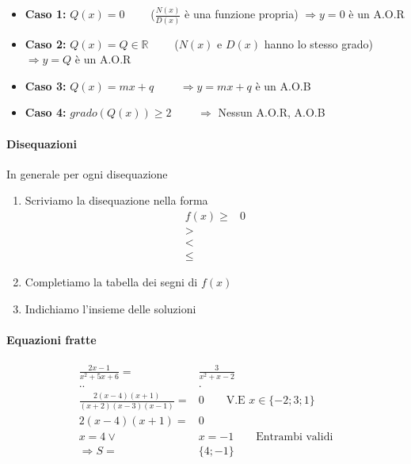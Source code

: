 \documentclass[../main.tex]{subfiles}
\begin{document}
\vspace{0.5cm}
\begin{itemize}
    \item \textbf{Caso 1:} $Q(x) = 0 \phantom{--}$ ($\frac{N(x)}{D(x)}$ è una funzione propria)
    $\Rightarrow y = 0$ è un A.O.R
    \item \textbf{Caso 2:} $Q(x) = Q \in \mathbb{R} \phantom{--}$ ($N(x)$ e $D(x)$ hanno lo stesso grado)
    $\Rightarrow y =Q$ è un A.O.R
    \item \textbf{Caso 3:} $Q(x) = mx+q \phantom{--}$
    $\Rightarrow y = mx+q$ è un A.O.B
    \item \textbf{Caso 4:} $grado(Q(x)) \geq 2 \phantom{--}$
    $\Rightarrow$ Nessun A.O.R, A.O.B 
\end{itemize}

\vspace{1cm}
\paragraph{Disequazioni}
In generale per ogni disequazione
\begin{enumerate}
    \item Scriviamo la disequazione nella forma \begin{align*}
        f(x) \geq& 0 \\
        >& \\
        <& \\
        \leq&
    \end{align*}
    \item Completiamo la tabella dei segni di $f(x)$
    \item Indichiamo l'insieme delle soluzioni
\end{enumerate}

\vspace{0.5cm}
\paragraph{Equazioni fratte}
\begin{align*}
    \frac{2x-1}{x^2+5x+6} =& \frac{3}{x^2+x-2} \\
    . .& . \\
    \frac{2(x-4)(x+1)}{(x+2)(x-3)(x-1)} =& 0 \phantom{--} \text{V.E } x \in \{ -2;3;1\} \\
    2(x-4)(x+1) =& 0 \\
    x = 4 \vee& x = -1 \phantom{--} \text{Entrambi validi} \\
    \Rightarrow S=&\{4;-1\}
\end{align*}
\end{document}
